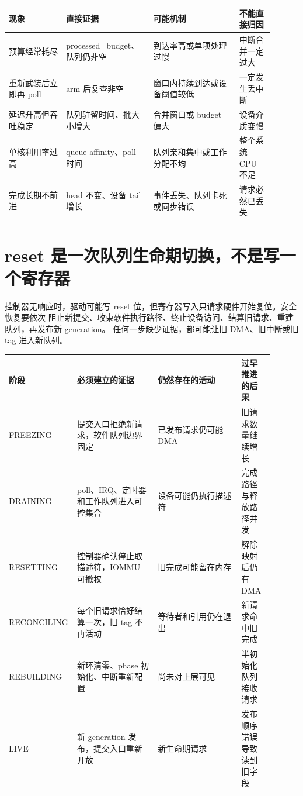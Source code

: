 \begin{longtable}{|L{0.2\linewidth}|L{0.28\linewidth}|L{0.3\linewidth}|L{0.12\linewidth}|}
\hline
现象 & 直接证据 & 可能机制 & 不能直接归因 \\ \hline
预算经常耗尽 & processed=budget、队列仍非空 & 到达率高或单项处理过慢 &
中断合并一定过大 \\\tablerowrule
重新武装后立即再 poll & arm 后复查非空 & 窗口内持续到达或设备阈值较低 &
一定发生丢中断 \\\tablerowrule
延迟升高但吞吐稳定 & 队列驻留时间、批大小增大 & 合并窗口或 budget 偏大 &
设备介质变慢 \\\tablerowrule
单核利用率过高 & queue affinity、poll 时间 & 队列亲和集中或工作分配不均 &
整个系统 CPU 不足 \\\tablerowrule
完成长期不前进 & head 不变、设备 tail 增长 & 事件丢失、队列卡死或同步错误 &
请求必然已丢失 \\ \hline
\end{longtable}

\section{reset 是一次队列生命期切换，不是写一个寄存器}

控制器无响应时，驱动可能写 reset 位，但寄存器写入只请求硬件开始复位。安全恢复要依次
阻止新提交、收束软件执行路径、终止设备访问、结算旧请求、重建队列，再发布新 generation。
任何一步缺少证据，都可能让旧 DMA、旧中断或旧 tag 进入新队列。

\begin{longtable}{|L{0.17\linewidth}|L{0.3\linewidth}|L{0.31\linewidth}|L{0.12\linewidth}|}
\hline
阶段 & 必须建立的证据 & 仍然存在的活动 & 过早推进的后果 \\ \hline
FREEZING & 提交入口拒绝新请求，软件队列边界固定 & 已发布请求仍可能 DMA &
旧请求数量继续增长 \\\tablerowrule
DRAINING & poll、IRQ、定时器和工作队列进入可控集合 & 设备可能仍执行描述符 &
完成路径与释放路径并发 \\\tablerowrule
RESETTING & 控制器确认停止取描述符，IOMMU 可撤权 & 旧完成可能留在内存 &
解除映射后仍有 DMA \\\tablerowrule
RECONCILING & 每个旧请求恰好结算一次，旧 tag 不再活动 & 等待者和引用仍在退出 &
新请求命中旧完成 \\\tablerowrule
REBUILDING & 新环清零、phase 初始化、中断重新配置 & 尚未对上层可见 &
半初始化队列接收请求 \\\tablerowrule
LIVE & 新 generation 发布，提交入口重新开放 & 新生命期请求 &
发布顺序错误导致读到旧字段 \\ \hline
\end{longtable}

